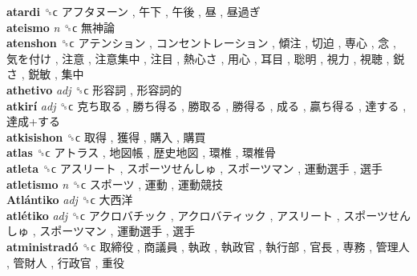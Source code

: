 \textbf{atardi} ␝ϲ   アフタヌーン ,  午下 ,  午後 ,  昼 ,  昼過ぎ   \\
\textbf{ateismo} \emph{n}  ␝ϲ   無神論   \\
\textbf{atenshon} ␝ϲ   アテンション ,  コンセントレーション ,  傾注 ,  切迫 ,  専心 ,  念 ,  気を付け ,  注意 ,  注意集中 ,  注目 ,  熱心さ ,  用心 ,  耳目 ,  聡明 ,  視力 ,  視聴 ,  鋭さ ,  鋭敏 ,  集中   \\
\textbf{athetivo} \emph{adj}  ␝ϲ   形容詞 ,  形容詞的   \\
\textbf{atkirí} \emph{adj}  ␝ϲ   克ち取る ,  勝ち得る ,  勝取る ,  勝得る ,  成る ,  贏ち得る ,  達する ,  達成+する   \\
\textbf{atkisishon} ␝ϲ   取得 ,  獲得 ,  購入 ,  購買   \\
\textbf{atlas} ␝ϲ   アトラス ,  地図帳 ,  歴史地図 ,  環椎 ,  環椎骨   \\
\textbf{atleta} ␝ϲ   アスリート ,  スポーツせんしゅ ,  スポーツマン ,  運動選手 ,  選手   \\
\textbf{atletismo} \emph{n}  ␝ϲ   スポーツ ,  運動 ,  運動競技   \\
\textbf{Atlántiko} \emph{adj}  ␝ϲ   大西洋   \\
\textbf{atlétiko} \emph{adj}  ␝ϲ   アクロバチック ,  アクロバティック ,  アスリート ,  スポーツせんしゅ ,  スポーツマン ,  運動選手 ,  選手   \\
\textbf{atministradó} ␝ϲ   取締役 ,  商議員 ,  執政 ,  執政官 ,  執行部 ,  官長 ,  専務 ,  管理人 ,  管財人 ,  行政官 ,  重役   \\
